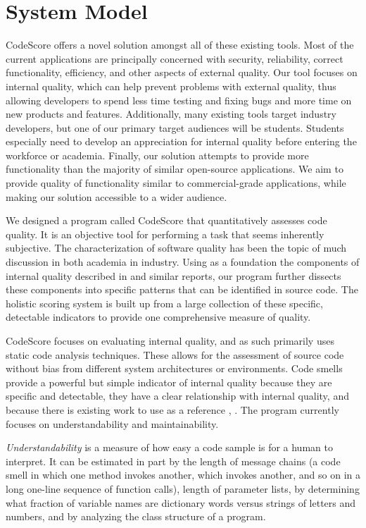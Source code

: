 \documentclass{sig-alternate}
\begin{document}
\section{System Model}
\label{sec:system_model}


CodeScore offers a novel solution amongst all of these existing tools.
Most of the current applications are principally concerned with security,
reliability, correct functionality, efficiency, and other aspects of external quality. Our tool 
focuses on internal quality, which can help prevent problems with external
quality, thus allowing developers to spend less time testing and fixing bugs and
more time on new products and features. Additionally, many existing tools
target industry developers, but one of our primary target audiences will be
students. Students especially need to develop an appreciation for internal quality
before entering the workforce or academia. Finally, our solution attempts to
provide more functionality than the majority of similar open-source
applications. We aim to provide quality of functionality similar to
commercial-grade applications, while making our solution accessible to a wider
audience.

We designed a program called CodeScore that quantitatively assesses code
quality. It is an objective tool for performing a task that seems inherently
subjective. The characterization of software quality has been the topic
of much discussion in both academia in industry. Using as a foundation the
components of internal quality described in \cite{iso2011iec} and similar
reports, our program further dissects these components into specific patterns
that can be identified in source code. The holistic scoring system is built up
from a large collection of these specific, detectable indicators to provide one
comprehensive measure of quality.

CodeScore focuses on evaluating internal quality, and as such primarily uses static code
analysis techniques. These allows for the assessment of source code without bias from different
system architectures or environments. Code smells provide a powerful but simple
indicator of internal quality because they are specific and detectable, they
have a clear relationship with internal quality, and because there is
existing work to use as a reference \cite{moha2009duchien}, \cite{palomba}. The
program currently focuses on understandability and maintainability. 

\emph{Understandability} is a measure of how easy a code sample is for a human to
interpret. It can be estimated in part by the length of message chains (a code
smell in which one method invokes another, which invokes another, and so on in a
long one-line sequence of function calls), length of parameter lists, by
determining what fraction of variable names are dictionary words versus strings
of letters and numbers, and by analyzing the class structure of a program. 
\end{document}
